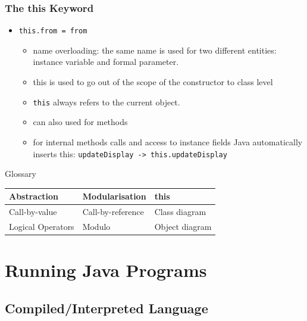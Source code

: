 \begin{frame}[fragile]
\frametitle{The this Keyword}
\begin{itemize}
\item \lstinline!this.from = from!
\begin{itemize}
\item \alert{name overloading}: the same name is used for two different entities: instance variable and formal parameter.
\item this is used to go out of the scope of the constructor to class level
\item \alert{\lstinline!this!} always refers to the current object.
\item can also used for methods
\item for internal methods calls and access to instance fields Java automatically inserts this:
\lstinline!updateDisplay -> this.updateDisplay!
\end{itemize}
\end{itemize}
\end{frame}


\begin{frame}{Glossary}
\begin{tabular}{|l|l|l|}
\hline
Abstraction & Modularisation & this\\
\hline
Call-by-value & Call-by-reference & Class diagram \\
\hline
Logical Operators & Modulo& Object diagram\\
\hline
\end{tabular}
\end{frame}

\section{Running Java Programs}

\subsection{Compiled/Interpreted Language}

